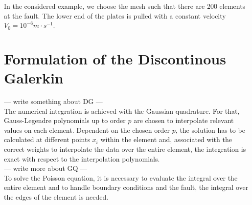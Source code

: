 In the considered example, we choose the mesh such that there are 200 elements at the fault. The lower end of the plates is pulled with a constant velocity $V_0 = 10^{-6} m\cdot s^{-1}$. 

\section{Formulation of the Discontinous Galerkin}

--- write something about DG --- \\ 


The numerical integration is achieved with the Gaussian quadrature. For that, Gauss-Legendre polynomials up to order $p$ are chosen to interpolate relevant values on each element. Dependent on the chosen order $p$, the solution has to be calculated at different points $x_i$ within the element and, associated with the correct weights to interpolate the data over the entire element, the integration is exact with respect to the interpolation polynomials. \\
--- write more about GQ --- \\

To solve the Poisson equation, it is necessary to evaluate the integral over the entire element and to handle boundary conditions and the fault, the integral over the edges of the element is needed. 


